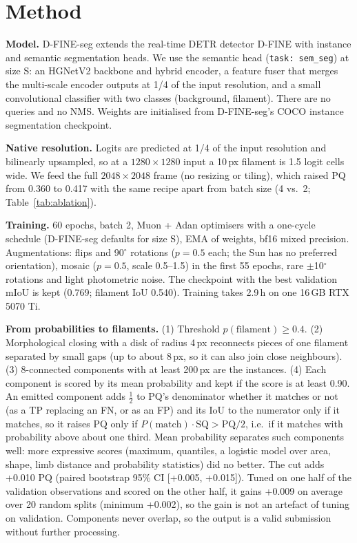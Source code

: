 \documentclass[sigconf]{acmart}
\begin{document}
\section{Method}\label{sec:method}
\textbf{Model.} D-FINE-seg \cite{saakyan2026dfineseg} extends the real-time DETR detector D-FINE \cite{peng2025dfine} with instance and semantic segmentation heads. We use the semantic head (\texttt{task: sem\_seg}) at size S: an HGNetV2 backbone and hybrid encoder, a feature fuser that merges the multi-scale encoder outputs at 1/4 of the input resolution, and a small convolutional classifier with two classes (background, filament). There are no queries and no NMS. Weights are initialised from D-FINE-seg's COCO instance segmentation checkpoint.

\textbf{Native resolution.} Logits are predicted at 1/4 of the input resolution and bilinearly upsampled, so at a $1280{\times}1280$ input a 10\,px filament is 1.5 logit cells wide. We feed the full $2048{\times}2048$ frame (no resizing or tiling), which raised PQ from 0.360 to 0.417 with the same recipe apart from batch size (4 vs.\ 2; Table~\ref{tab:ablation}).

\textbf{Training.} 60 epochs, batch 2, Muon + Adan optimisers with a one-cycle schedule (D-FINE-seg defaults for size S), EMA of weights, bf16 mixed precision. Augmentations: flips and 90$^\circ$ rotations ($p=0.5$ each; the Sun has no preferred orientation), mosaic ($p=0.5$, scale 0.5--1.5) in the first 55 epochs, rare $\pm$10$^\circ$ rotations and light photometric noise. The checkpoint with the best validation mIoU is kept (0.769; filament IoU 0.540). Training takes 2.9\,h on one 16\,GB RTX 5070 Ti.

\textbf{From probabilities to filaments.} (1) Threshold $p(\text{filament}) \geq 0.4$. (2) Morphological closing with a disk of radius 4\,px reconnects pieces of one filament separated by small gaps (up to about 8\,px, so it can also join close neighbours). (3) 8-connected components with at least 200\,px are the instances. (4) Each component is scored by its mean probability and kept if the score is at least 0.90. An emitted component adds $\frac{1}{2}$ to PQ's denominator whether it matches or not (as a TP replacing an FN, or as an FP) and its IoU to the numerator only if it matches, so it raises PQ only if $P(\text{match})\cdot\text{SQ} > \text{PQ}/2$, i.e.\ if it matches with probability above about one third. Mean probability separates such components well: more expressive scores (maximum, quantiles, a logistic model over area, shape, limb distance and probability statistics) did no better. The cut adds +0.010 PQ (paired bootstrap 95\% CI [+0.005, +0.015]). Tuned on one half of the validation observations and scored on the other half, it gains +0.009 on average over 20 random splits (minimum +0.002), so the gain is not an artefact of tuning on validation. Components never overlap, so the output is a valid submission without further processing.
\end{document}
